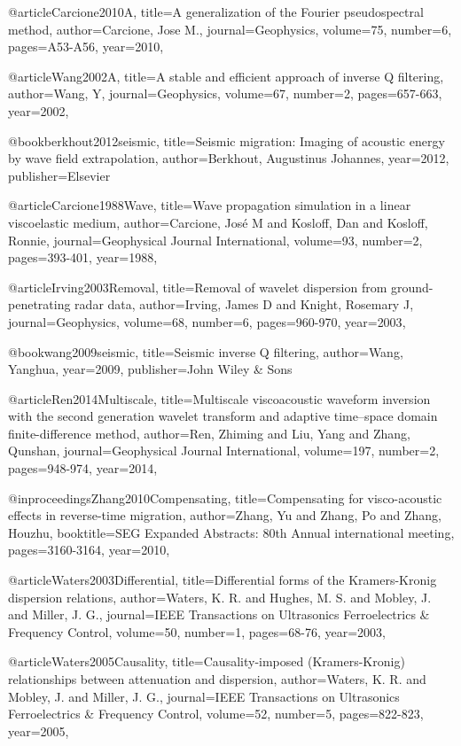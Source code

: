 {@article{Carcione2010A,
  title={A generalization of the {F}ourier pseudospectral method},
  author={Carcione, Jose M.},
  journal={Geophysics},
  volume={75},
  number={6},
  pages={A53-A56},
  year={2010},
}

@article{Wang2002A,
  title={A stable and efficient approach of inverse {Q} filtering},
  author={Wang, Y},
  journal={Geophysics},
  volume={67},
  number={2},
  pages={657-663},
  year={2002},
}

@book{berkhout2012seismic,
  title={Seismic migration: Imaging of acoustic energy by wave field extrapolation},
  author={Berkhout, Augustinus Johannes},
  year={2012},
  publisher={Elsevier}
}

@article{Carcione1988Wave,
  title={Wave propagation simulation in a linear viscoelastic medium},
  author={Carcione, José M and Kosloff, Dan and Kosloff, Ronnie},
  journal={Geophysical Journal International},
  volume={93},
  number={2},
  pages={393-401},
  year={1988},
}

@article{Irving2003Removal,
  title={Removal of wavelet dispersion from ground-penetrating radar data},
  author={Irving, James D and Knight, Rosemary J},
  journal={Geophysics},
  volume={68},
  number={6},
  pages={960-970},
  year={2003},
}

@book{wang2009seismic,
  title={Seismic inverse {Q} filtering},
  author={Wang, Yanghua},
  year={2009},
  publisher={John Wiley \& Sons}
}

@article{Ren2014Multiscale,
  title={Multiscale viscoacoustic waveform inversion with the second generation wavelet transform and adaptive time–space domain finite-difference method},
  author={Ren, Zhiming and Liu, Yang and Zhang, Qunshan},
  journal={Geophysical Journal International},
  volume={197},
  number={2},
  pages={948-974},
  year={2014},
}

@inproceedings{Zhang2010Compensating,
  title={Compensating for visco-acoustic effects in reverse-time migration},
  author={Zhang, Yu and Zhang, Po and Zhang, Houzhu},
  booktitle={SEG Expanded Abstracts: 80th Annual international meeting},
  pages={3160-3164},
  year={2010},
}

@article{Waters2003Differential,
  title={Differential forms of the Kramers-Kronig dispersion relations},
  author={Waters, K. R. and Hughes, M. S. and Mobley, J. and Miller, J. G.},
  journal={IEEE Transactions on Ultrasonics Ferroelectrics \& Frequency Control},
  volume={50},
  number={1},
  pages={68-76},
  year={2003},
}

@article{Waters2005Causality,
  title={Causality-imposed (Kramers-Kronig) relationships between attenuation and dispersion},
  author={Waters, K. R. and Mobley, J. and Miller, J. G.},
  journal={IEEE Transactions on Ultrasonics Ferroelectrics \& Frequency Control},
  volume={52},
  number={5},
  pages={822-823},
  year={2005},
}

}
